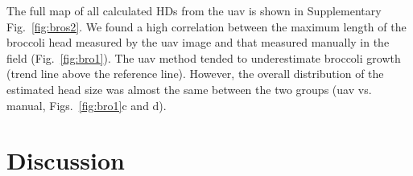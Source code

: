 The full map of all calculated HDs from the \gls{uav} is shown in Supplementary Fig.~\ref{fig:bros2}. We found a high correlation between the maximum length of the broccoli head measured by the \gls{uav} image and that measured manually in the field (Fig.~\ref{fig:bro1}). The \gls{uav} method tended to underestimate broccoli growth (trend line above the reference line). However, the overall distribution of the estimated head size was almost the same between the two groups (\gls{uav} vs. manual, Figs.~\ref{fig:bro1}c and d). 




\section{Discussion}


